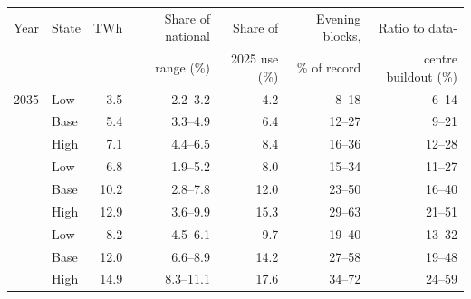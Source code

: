\begin{tabular}{@{}llrrrrr@{}}
\toprule
Year & State & TWh & Share of national & Share of & Evening blocks, & Ratio to data- \\
 & & & range (\%) & 2025 use (\%) & \% of record & centre buildout (\%) \\
\midrule
2035 & Low & 3.5 & 2.2--3.2 & 4.2 & 8--18 & 6--14 \\
 & Base & 5.4 & 3.3--4.9 & 6.4 & 12--27 & 9--21 \\
 & High & 7.1 & 4.4--6.5 & 8.4 & 16--36 & 12--28 \\
\addlinespace
2045 & Low & 6.8 & 1.9--5.2 & 8.0 & 15--34 & 11--27 \\
 & Base & 10.2 & 2.8--7.8 & 12.0 & 23--50 & 16--40 \\
 & High & 12.9 & 3.6--9.9 & 15.3 & 29--63 & 21--51 \\
\addlinespace
2050 & Low & 8.2 & 4.5--6.1 & 9.7 & 19--40 & 13--32 \\
 & Base & 12.0 & 6.6--8.9 & 14.2 & 27--58 & 19--48 \\
 & High & 14.9 & 8.3--11.1 & 17.6 & 34--72 & 24--59 \\
\bottomrule
\end{tabular}
